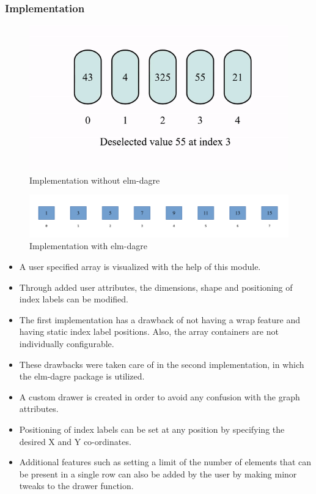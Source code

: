 \begin{FlushLeft}
\subsubsection{Implementation}
\begin{figure}[h]
    \centering
    \includegraphics[width=5in]{imgs/elm-arr-1.png}
    \caption{Implementation without elm-dagre}
\end{figure}

\begin{figure}[h]
    \centering
    \includegraphics[width=5in]{imgs/elm-arr-2.png}
    \caption{Implementation with elm-dagre}
\end{figure}

\begin{itemize}
    \item A user specified array is visualized with the help of this module. 
    \item Through added user attributes, the dimensions, shape and positioning of index labels can be modified. 
    \item The first implementation has a drawback of not having a wrap feature and having static index label positions. Also, the array containers are not individually configurable. 
    \item These drawbacks were taken care of in the second implementation, in which the elm-dagre package is utilized. 
    \item A custom drawer is created in order to avoid any confusion with the graph attributes.
    \item Positioning of index labels can be set at any position by specifying the desired X and Y co-ordinates. 
    \item Additional features such as setting a limit of the number of elements that can be present in a single row can also be added by the user by making minor tweaks to the drawer function. 
\end{itemize}


\end{FlushLeft}

